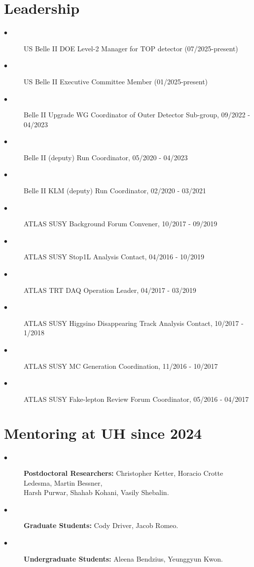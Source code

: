 \documentclass[12pt]{article}
\begin{document}
{\section*{\large{Leadership}} 
{\footnotesize
\begin{description}
\item[$\bullet$]{US Belle II DOE Level-2 Manager for TOP detector (07/2025-present)}
\item[$\bullet$]{US Belle II Executive Committee Member (01/2025-present)}
\item[$\bullet$]{Belle II Upgrade WG Coordinator of Outer Detector Sub-group, 09/2022 - 04/2023}
\item[$\bullet$]{Belle II (deputy) Run Coordinator, 05/2020 - 04/2023}
\item[$\bullet$]{Belle II KLM (deputy) Run Coordinator, 02/2020 - 03/2021}
\item[$\bullet$]{ATLAS SUSY Background Forum Convener, 10/2017 - 09/2019}
\item[$\bullet$]{ATLAS SUSY Stop1L Analysis Contact, 04/2016 - 10/2019} 
\item[$\bullet$]{ATLAS TRT DAQ Operation Leader, 04/2017 - 03/2019}
\item[$\bullet$]{ATLAS SUSY Higgsino Disappearing Track Analysis Contact, 10/2017 - 1/2018}
\item[$\bullet$]{ATLAS SUSY MC Generation Coordination, 11/2016 - 10/2017}
\item[$\bullet$]{ATLAS SUSY Fake-lepton Review Forum Coordinator, 05/2016 - 04/2017} \\
\end{description}
}

\vspace{-0.2in}
\section*{\large{Mentoring at UH since 2024}} 
{\footnotesize
\begin{description}
\item[$\bullet$]{\textbf{Postdoctoral Researchers:} Christopher Ketter, Horacio Crotte Ledesma, Martin Bessner, \\
\hspace{-0.25in} Harsh Purwar, Shahab Kohani, Vasily Shebalin.}
\item[$\bullet$]{\textbf{Graduate Students:} Cody Driver, Jacob Romeo.}
\item[$\bullet$]{\textbf{Undergraduate Students:} Aleena Bendzius, Yeunggyun Kwon.}
\end{description}
}

}
\end{document}
